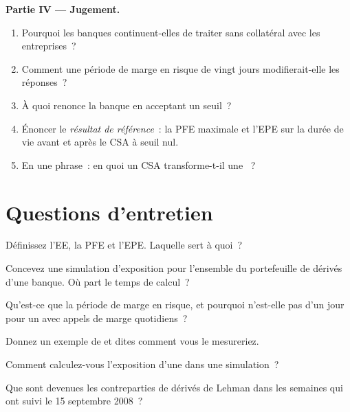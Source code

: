 \begin{problem}
\medskip\noindent\textbf{Partie IV --- Jugement.}
\begin{enumerate}[resume]
\item Pourquoi les banques continuent-elles de traiter sans collatéral avec les entreprises~?
\item Comment une période de marge en risque de vingt jours modifierait-elle les réponses~?
\item À quoi renonce la banque en acceptant un seuil~?
\item Énoncer le \emph{résultat de référence}~: la PFE maximale et l'EPE sur la durée de vie avant et après le
CSA à seuil nul.
\item En une phrase~: en quoi un CSA transforme-t-il une ~?
\end{enumerate}
\end{problem}

\section{Questions d'entretien}

\begin{interviewq}\label{iq:rc:counterparty-exposure:1}
Définissez l'EE, la PFE et l'EPE. Laquelle sert à quoi~?
\end{interviewq}

\begin{interviewq}\label{iq:rc:counterparty-exposure:2}
Concevez une simulation d'exposition pour l'ensemble du portefeuille de dérivés d'une banque. Où part le temps de calcul~?
\end{interviewq}

\begin{interviewq}\label{iq:rc:counterparty-exposure:3}
Qu'est-ce que la période de marge en risque, et pourquoi n'est-elle pas d'un jour pour un 
avec appels de marge quotidiens~?
\end{interviewq}

\begin{interviewq}\label{iq:rc:counterparty-exposure:4}
Donnez un exemple de  et dites comment vous le mesureriez.
\end{interviewq}

\begin{interviewq}\label{iq:rc:counterparty-exposure:5}
Comment calculez-vous l'exposition d'une  dans une simulation~?
\end{interviewq}

\begin{interviewq}\label{iq:rc:counterparty-exposure:6}
Que sont devenues les contreparties de dérivés de Lehman dans les semaines qui ont suivi le 15 septembre 2008~?
\end{interviewq}
